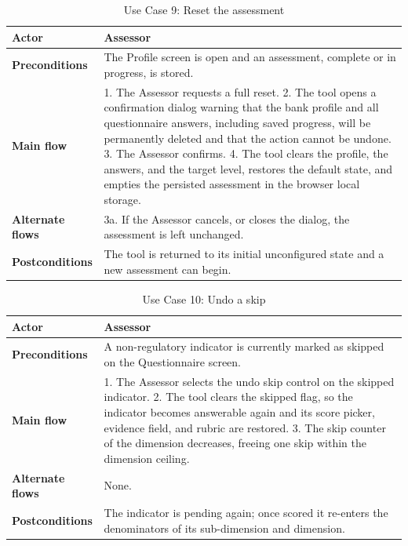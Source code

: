 \begin{table}[H]
\centering
\caption{Use Case 9: Reset the assessment} \label{tab:uc09}
\begin{tabular}{|p{3cm}|p{12cm}|}
\hline
\textbf{Actor} & Assessor \\
\hline
\textbf{Preconditions} & The Profile screen is open and an assessment, complete or in progress, is stored. \\
\hline
\textbf{Main flow} & 1. The Assessor requests a full reset. 2. The tool opens a confirmation dialog warning that the bank profile and all questionnaire answers, including saved progress, will be permanently deleted and that the action cannot be undone. 3. The Assessor confirms. 4. The tool clears the profile, the answers, and the target level, restores the default state, and empties the persisted assessment in the browser local storage. \\
\hline
\textbf{Alternate flows} & 3a. If the Assessor cancels, or closes the dialog, the assessment is left unchanged. \\
\hline
\textbf{Postconditions} & The tool is returned to its initial unconfigured state and a new assessment can begin. \\
\hline
\end{tabular}

\end{table}

\begin{table}[H]
\centering
\caption{Use Case 10: Undo a skip} \label{tab:uc10}
\begin{tabular}{|p{3cm}|p{12cm}|}
\hline
\textbf{Actor} & Assessor \\
\hline
\textbf{Preconditions} & A non-regulatory indicator is currently marked as skipped on the Questionnaire screen. \\
\hline
\textbf{Main flow} & 1. The Assessor selects the undo skip control on the skipped indicator. 2. The tool clears the skipped flag, so the indicator becomes answerable again and its score picker, evidence field, and rubric are restored. 3. The skip counter of the dimension decreases, freeing one skip within the dimension ceiling. \\
\hline
\textbf{Alternate flows} & None. \\
\hline
\textbf{Postconditions} & The indicator is pending again; once scored it re-enters the denominators of its sub-dimension and dimension. \\
\hline
\end{tabular}

\end{table}

